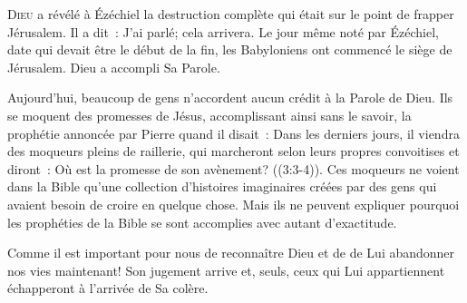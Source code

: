 \dvrule






\lettrine{D}{ieu} a révélé à Ézéchiel la destruction complète
 qui était sur le point de frapper Jérusalem. Il a dit~: 
 \Og J'ai parlé; cela arrivera. \Fg{}
 Le jour même noté par Ézéchiel, date qui devait être le début de la fin,
 les Babyloniens ont commencé le siège de Jérusalem. Dieu a accompli Sa Parole. 


Aujourd'hui, beaucoup de gens n'accordent aucun crédit à la Parole de Dieu.
 Ils se moquent des promesses de Jésus, accomplissant ainsi sans le savoir,
 la prophétie annoncée par Pierre quand il disait~: 
 \Og Dans les derniers jours, il viendra des moqueurs pleins de raillerie,
 qui marcheront selon leurs propres convoitises et diront~:
 Où est la promesse de son avènement? \Fg{}
 ((3:3-4)).
 Ces moqueurs ne voient dans la Bible qu'une collection d'histoires imaginaires
 créées par des gens qui avaient besoin de croire en quelque chose.
 Mais ils ne peuvent expliquer pourquoi les prophéties de la Bible
 se sont accomplies avec autant d'exactitude. 

Comme il est important pour nous de reconnaître Dieu et de de Lui abandonner
 nos vies maintenant! Son jugement arrive et, seuls, ceux qui Lui appartiennent
 échapperont à l'arrivée de Sa colère. 

\dvrule



